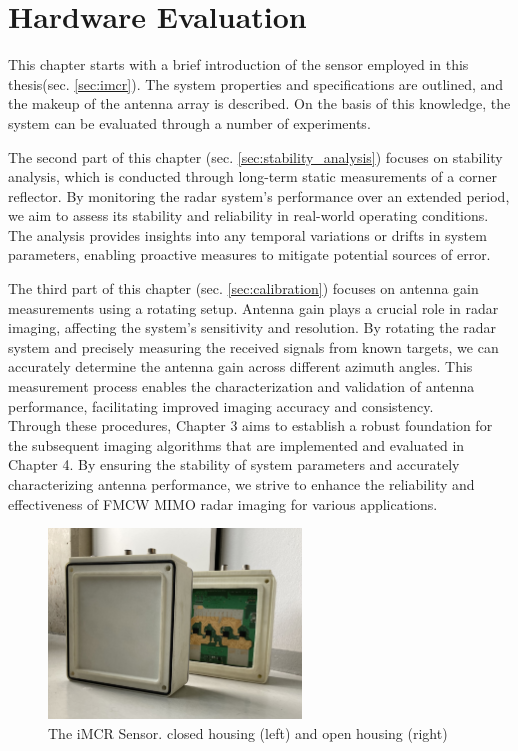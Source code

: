 \chapter{Hardware Evaluation}
\label{ch:hardware}
This chapter starts with a brief introduction of the sensor employed in this thesis(sec. \ref{sec:imcr}).
The system properties and specifications are outlined, and the makeup of the antenna array is described.
On the basis of this knowledge, the system can be evaluated through a number of experiments.

The second part of this chapter (sec. \ref{sec:stability_analysis}) focuses on stability analysis,
which is conducted through long-term static measurements of a corner reflector.
By monitoring the radar system's performance over an extended period,
we aim to assess its stability and reliability in real-world operating conditions.
The analysis provides insights into any temporal variations or drifts in system parameters,
enabling proactive measures to mitigate potential sources of error.

The third part of this chapter (sec. \ref{sec:calibration}) focuses on antenna gain measurements using a rotating setup.
Antenna gain plays a crucial role in radar imaging, affecting the system's sensitivity and resolution.
By rotating the radar system and precisely measuring the received signals from known targets,
we can accurately determine the antenna gain across different azimuth angles.
This measurement process enables the characterization and validation of antenna performance,
facilitating improved imaging accuracy and consistency. \\

Through these procedures, Chapter 3 aims to establish a robust foundation
for the subsequent imaging algorithms that are implemented and evaluated in Chapter 4.
By ensuring the stability of system parameters and accurately characterizing antenna performance,
we strive to enhance the reliability and effectiveness of FMCW MIMO radar imaging for various applications.

\begin{figure}
    \centering
    \includegraphics[width=0.6\textwidth]{../figures/imcr.jpg}
    \caption{The iMCR Sensor. closed housing (left) and open housing (right)}
    \label{fig:imcr}
\end{figure}

